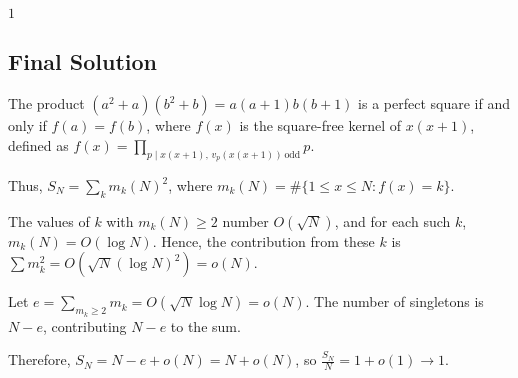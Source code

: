 \documentclass[12pt,a4paper]{article}
\theoremstyle{definition}
\begin{document}
    $\boxed{1}$

\subsection{Final Solution}
    The product $(a^2 + a)(b^2 + b) = a(a+1)b(b+1)$ is a perfect square if and only if $f(a) = f(b)$, where $f(x)$ is the square-free kernel of $x(x+1)$, defined as $f(x) = \prod_{p \mid x(x+1),\, v_p(x(x+1))\, \mathrm{odd}} p$.

    Thus, $S_N = \sum_k m_k(N)^2$, where $m_k(N) = \# \{ 1 \leq x \leq N : f(x) = k \}$.

    The values of $k$ with $m_k(N) \geq 2$ number $O(\sqrt{N})$, and for each such $k$, $m_k(N) = O(\log N)$. Hence, the contribution from these $k$ is $\sum m_k^2 = O(\sqrt{N} (\log N)^2) = o(N)$.

    Let $e = \sum_{m_k \geq 2} m_k = O(\sqrt{N} \log N) = o(N)$. The number of singletons is $N - e$, contributing $N - e$ to the sum.

    Therefore, $S_N = N - e + o(N) = N + o(N)$, so $\frac{S_N}{N} = 1 + o(1) \to 1$.

\end{document}
